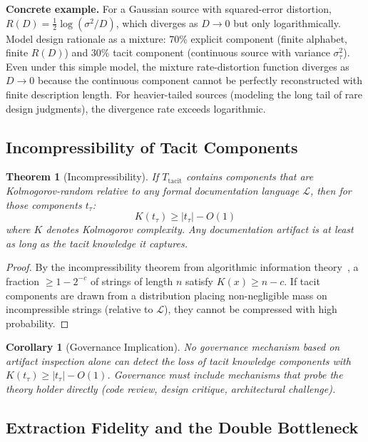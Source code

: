 \documentclass[11pt, a4paper, copyright]{googledeepmind}
\newtheorem{theorem}{Theorem}[section]
\newtheorem{corollary}{Corollary}[section]
\begin{document}
\textbf{Concrete example.} For a Gaussian source with squared-error distortion, $R(D) = \frac{1}{2}\log(\sigma^2/D)$, which diverges as $D \to 0$ but only logarithmically. Model design rationale as a mixture: 70\% explicit component (finite alphabet, finite $R(D)$) and 30\% tacit component (continuous source with variance $\sigma^2_\tau$). Even under this simple model, the mixture rate-distortion function diverges as $D \to 0$ because the continuous component cannot be perfectly reconstructed with finite description length. For heavier-tailed sources (modeling the long tail of rare design judgments), the divergence rate exceeds logarithmic.

\subsection{Incompressibility of Tacit Components}

\begin{theorem}[Incompressibility]
\label{thm:incompress}
If $T_{\mathrm{tacit}}$ contains components that are Kolmogorov-random relative to any formal documentation language $\mathcal{L}$, then for those components $t_\tau$:
\begin{equation}
    K(t_\tau) \geq |t_\tau| - O(1)
\end{equation}
where $K$ denotes Kolmogorov complexity. Any documentation artifact is at least as long as the tacit knowledge it captures.
\end{theorem}

\begin{proof}
By the incompressibility theorem from algorithmic information theory~\citep{chaitin1974}, a fraction $\geq 1 - 2^{-c}$ of strings of length $n$ satisfy $K(x) \geq n - c$. If tacit components are drawn from a distribution placing non-negligible mass on incompressible strings (relative to $\mathcal{L}$), they cannot be compressed with high probability.
\end{proof}

\begin{corollary}[Governance Implication]
\label{cor:governance}
No governance mechanism based on artifact inspection alone can detect the loss of tacit knowledge components with $K(t_\tau) \geq |t_\tau| - O(1)$. Governance must include mechanisms that probe the theory holder directly (code review, design critique, architectural challenge).
\end{corollary}

\subsection{Extraction Fidelity and the Double Bottleneck}
\end{document}
